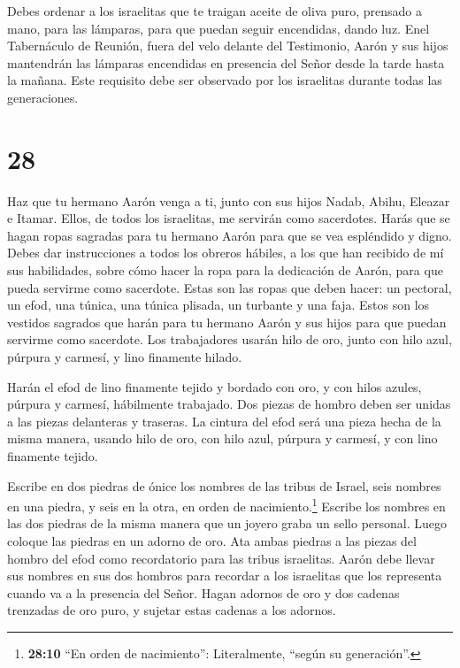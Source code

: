  Debes ordenar a los israelitas que te traigan aceite de
oliva puro, prensado a mano, para las lámparas, para que puedan seguir
encendidas, dando luz.  Enel Tabernáculo de Reunión, fuera
del velo delante del Testimonio, Aarón y sus hijos mantendrán las
lámparas encendidas en presencia del Señor desde la tarde hasta la
mañana. Este requisito debe ser observado por los israelitas durante
todas las generaciones.

\hypertarget{section-27}{%
\section{28}\label{section-27}}

 Haz que tu hermano Aarón venga a ti, junto con sus hijos
Nadab, Abihu, Eleazar e Itamar. Ellos, de todos los israelitas, me
servirán como sacerdotes.  Harás que se hagan ropas sagradas
para tu hermano Aarón para que se vea espléndido y digno. 
Debes dar instrucciones a todos los obreros hábiles, a los que han
recibido de mí sus habilidades, sobre cómo hacer la ropa para la
dedicación de Aarón, para que pueda servirme como sacerdote.
 Estas son las ropas que deben hacer: un pectoral, un efod,
una túnica, una túnica plisada, un turbante y una faja. Estos son los
vestidos sagrados que harán para tu hermano Aarón y sus hijos para que
puedan servirme como sacerdote.  Los trabajadores usarán
hilo de oro, junto con hilo azul, púrpura y carmesí, y lino finamente
hilado.

 Harán el efod de lino finamente tejido y bordado con oro, y
con hilos azules, púrpura y carmesí, hábilmente trabajado. 
Dos piezas de hombro deben ser unidas a las piezas delanteras y
traseras.  La cintura del efod será una pieza hecha de la
misma manera, usando hilo de oro, con hilo azul, púrpura y carmesí, y
con lino finamente tejido.

 Escribe en dos piedras de ónice los nombres de las tribus
de Israel,  seis nombres en una piedra, y seis en la otra,
en orden de nacimiento.\footnote{\textbf{28:10} ``En orden de
  nacimiento'': Literalmente, ``según su generación''.} 
Escribe los nombres en las dos piedras de la misma manera que un joyero
graba un sello personal. Luego coloque las piedras en un adorno de oro.
 Ata ambas piedras a las piezas del hombro del efod como
recordatorio para las tribus israelitas. Aarón debe llevar sus nombres
en sus dos hombros para recordar a los israelitas que los representa
cuando va a la presencia del Señor.  Hagan adornos de oro
 y dos cadenas trenzadas de oro puro, y sujetar estas
cadenas a los adornos.

